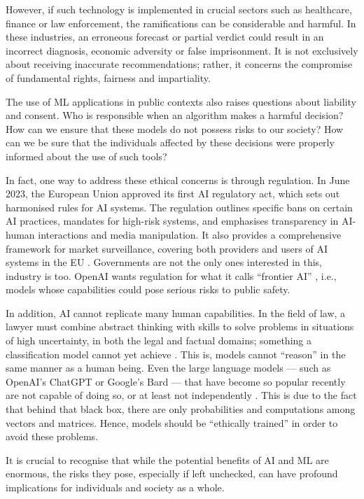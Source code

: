 \documentclass[twoside,11pt]{article}
\begin{document}
However,  if such technology is implemented in crucial sectors such as healthcare, finance or law enforcement, the ramifications can be considerable and harmful. In these industries, an erroneous forecast or partial verdict could result in an incorrect diagnosis, economic adversity or false imprisonment. It is not exclusively about receiving inaccurate recommendations; rather, it concerns the compromise of fundamental rights, fairness and impartiality.

The use of ML applications in public contexts also raises questions about liability and consent. Who is responsible when an algorithm makes a harmful decision? How can we ensure that these models do not possess risks to our society? How can we be sure that the individuals affected by these decisions were properly informed about the use of such tools? 

In fact, one way to address these ethical concerns is through regulation. In June 2023, the European Union approved its first AI regulatory act, which sets out harmonised rules for AI systems. The regulation outlines specific bans on certain AI practices, mandates for high-risk systems, and emphasises transparency in AI-human interactions and media manipulation. It also provides a comprehensive framework for market surveillance, covering both providers and users of AI systems in the EU .  Governments are not the only ones interested in this, industry is too. OpenAI wants regulation for what it calls ``frontier AI'' , i.e., models whose capabilities could pose serious risks to public safety. 

In addition, AI cannot replicate many human capabilities. In the field of law, a lawyer must combine abstract thinking with skills to solve problems in situations of high uncertainty, in both the legal and factual domains; something a classification model cannot yet achieve . This is, models cannot ``reason'' in the same manner as a human being. Even the large language models — such as OpenAI's ChatGPT or Google's Bard — that have become so popular recently are not capable of doing so, or at least not independently . This is due to the fact that behind that black box, there are only probabilities and computations among vectors and matrices. Hence, models should be ``ethically trained'' in order to avoid these problems.

It is crucial to recognise that while the potential benefits of AI and ML are enormous, the risks they pose, especially if left unchecked, can have profound implications for individuals and society as a whole.
\end{document}
